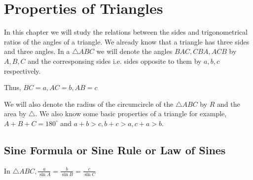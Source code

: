\chapter{Properties of Triangles}
In this chapter we will study the relations between the sides and trigonometrical ratios of the angles of a triangle. We already
know that a triangle has three sides and three angles. In a $\triangle ABC$ we will denote the angles $BAC, CBA, ACB$
by $A, B, C$ and the corresponsing sides i.e. sides opposite to them by $a, b, c$ respectively.

Thus, $BC = a, AC = b, AB = c$

We will also denote the radius of the circumcircle of the $\triangle ABC$ by $R$ and the area by $\triangle.$ We
also know some basic properties of a triangle for example, $A + B  + C = 180^\circ$ and $a + b > c, b + c > a, c + a >
b$.

\section{Sine Formula or Sine Rule or Law of Sines}
\begin{theorem}
  In $\triangle ABC, \frac{a}{\sin A} = \frac{b}{\sin B} = \frac{c}{\sin C}$
\end{theorem}

